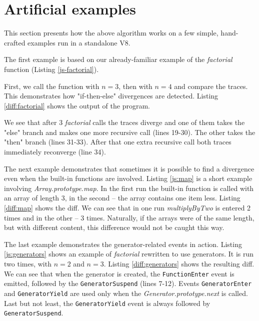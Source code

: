 \section{Artificial examples}

This section presents how the above algorithm works on a few simple, hand-crafted examples run in a standalone V8.

The first example is based on our already-familiar example of the \emph{factorial} function (Listing \ref{js-factorial}).

First, we call the function with $n=3$, then with $n=4$ and compare the traces.
This demonstrates how "if-then-else" divergences are detected.
Listing \ref{diff:factorial} shows the output of the program.

We see that after 3 \emph{factorial} calls the traces diverge and one of them takes the "else"
branch and makes one more recursive call (lines 19-30). The other takes the "then" branch (lines 31-33).
After that one extra recursive call both traces immediately reconverge (line 34).



The next example demonstrates that sometimes it is possible to find a divergence even when
the built-in functions are involved. Listing \ref{js:map} is a short example involving \emph{Array.prototype.map}.
In the first run the built-in function is called with an array of length 3, in the second -- the array contains one item less.
Listing \ref{diff:map} shows the diff. We can see that in one run \emph{multiplyByTwo} is entered 2 times and in the
other -- 3 times. Naturally, if the arrays were of the same length, but with different content, this difference would not
be caught this way.




						
The last example demonstrates the generator-related events in action.
Listing \ref{js:generators} shows an example of \emph{factorial} rewritten to use generators. It is run two times, with $n=2$ and $n=3$.
Listing \ref{diff:generators} shows the resulting diff. We can see that when the generator is created, the \texttt{FunctionEnter} event
is emitted, followed by the \texttt{GeneratorSuspend} (lines 7-12). Events \texttt{GeneratorEnter} and \texttt{GeneratorYield} are used 
only when the \emph{Generator.prototype.next} is called. Last but not least, the \texttt{GeneratorYield} event is always followed by 
\texttt{GeneratorSuspend}.

